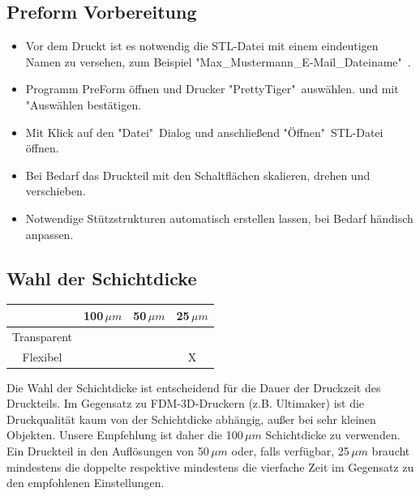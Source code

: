 \documentclass{\basedir/fablab-document}
\begin{document}
 \subsection{Preform Vorbereitung}
 
	\begin{itemize}
		\item Vor dem Druckt ist es notwendig die STL-Datei mit einem eindeutigen Namen zu versehen, zum Beispiel "Max\_Mustermann\_E-Mail\_Dateiname"\ .
		\item Programm PreForm öffnen und Drucker "PrettyTiger"\, auswählen. und mit "Auswählen bestätigen.
		\item Mit Klick auf den "Datei"\ Dialog und anschließend "Öffnen"\ STL-Datei öffnen.
		\item Bei Bedarf das Druckteil mit den Schaltflächen skalieren, drehen und verschieben.
		\item Notwendige Stützstrukturen automatisch erstellen lassen, bei Bedarf händisch anpassen.
	\end{itemize}

\subsection{Wahl der Schichtdicke}

\begin{table} [H]
	\centering
	\begin{tabular}{|c|c|c|c|}\hline
	  & 100\,$\mu m$ & 50\,$\mu m$ & 25\,$\mu m $\\ \hline
	Transparent & \checkmark &\checkmark &\checkmark \\ \hline
	Flexibel & \checkmark &\checkmark & X\\ \hline
	\end{tabular}
\end{table}

Die Wahl der Schichtdicke ist entscheidend für die Dauer der Druckzeit des Druckteils. Im Gegensatz zu FDM-3D-Druckern (z.B. Ultimaker) ist die Druckqualität kaum von der Schichtdicke abhängig, außer bei sehr kleinen Objekten. Unsere Empfehlung ist daher die 100\,$\mu m$ Schichtdicke zu verwenden. \\
Ein Druckteil in den Auflösungen von 50\,$\mu m$ oder, falls verfügbar, 25\,$\mu m$ braucht mindestens die doppelte respektive mindestens die vierfache Zeit im Gegensatz zu den empfohlenen Einstellungen.
		 	
\end{document}

